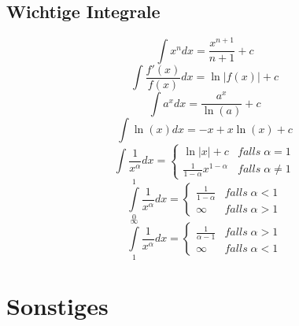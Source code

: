 \documentclass[a4paper,twocolumn,10pt]{article}
\begin{document}
\subsection{Wichtige Integrale}
\begin{equation*}
\int x^n dx=\frac{x^{n+1}}{n+1}+c
\end{equation*}
\begin{equation*}
\int \frac{f'(x)}{f(x)}dx=\ln|f(x)|+c
\end{equation*}
\begin{equation*}
\int a^x dx=\frac{a^x}{\ln(a)}+c
\end{equation*}
\begin{equation*}
\int \ln(x)dx=-x+x\ln(x)+c
\end{equation*}
\begin{equation*}
\int\frac{1}{x^{\alpha}}dx=\begin{cases}\ln|x|+c & falls\;\alpha =1 \\ \frac{1}{1-\alpha}x^{1-\alpha} & falls\;\alpha\neq 1\end{cases}
\end{equation*}
\begin{equation*}
\int\limits_{0}^{1}\frac{1}{x^{\alpha}}dx=\begin{cases}\frac{1}{1-\alpha} & falls\;\alpha<1 \\ \infty & falls\;\alpha>1\end{cases}
\end{equation*}
\begin{equation*}
\int\limits_{1}^{\infty}\frac{1}{x^{\alpha}}dx=\begin{cases}\frac{1}{\alpha-1} & falls\;\alpha>1 \\ \infty & falls\;\alpha <1\end{cases}
\end{equation*}

\section{Sonstiges}
\end{document}
